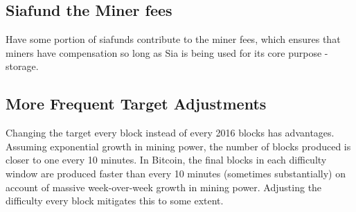 \documentclass[twocolumn]{article}
\begin{document}


\subsection{Siafund the Miner fees}
Have some portion of siafunds contribute to the miner fees, which ensures that miners have compensation so long as Sia is being used for its core purpose - storage.



\subsection{More Frequent Target Adjustments}
Changing the target every block instead of every 2016 blocks has advantages.
Assuming exponential growth in mining power, the number of blocks produced is closer to one every 10 minutes.
In Bitcoin, the final blocks in each difficulty window are produced faster than every 10 minutes (sometimes substantially) on account of massive week-over-week growth in mining power.
Adjusting the difficulty every block mitigates this to some extent.
\end{document}
